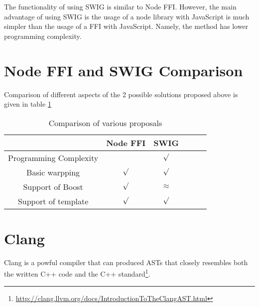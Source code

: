 The functionality of using SWIG is similar to Node FFI. However, the main advantage of using SWIG is the usage of a node library with JavaScript is much simpler than the usage of a FFI with JavaScript. Namely, the method has lower programming complexity. 


\section{Node FFI and SWIG Comparison}
Comparison of different aspects of the 2 possible solutions proposed above is given in table  \ref{tab:ProposalsComparison}

\begin{table}[H] %
    \begin{center}
        \begin{tabular}{c|ccccc}
                                     & Node FFI & SWIG  \\
            \hline
            Programming Complexity   &          &$\surd$ \\  
            
            Basic warpping           &  $\surd$  &$\surd$ \\ 
            
            Support of Boost         & $\surd$  &$\approx$\\
            
            Support of template      &  $\surd$  &$\surd$ \\
                        
            
        \end{tabular}
    \end{center}
    \caption{Comparison of various proposals}
    \label{tab:ProposalsComparison}
\end{table}

\begin{comment}
If too many ideas have been enumerated and none can be totally and formally demonstrated to be the best, then some choice has probably to bemade in order to limit the time-consuming experiments that follow.  It is preferable to achieve a few well-conducted experiments that will provide unquestionable conclusions though in a limited scope.
\end{comment}


\section{Clang}
Clang is a powful compiler that can produced ASTs that closely resembles both the written C++ code and the C++ standard\footnote{\url{http://clang.llvm.org/docs/IntroductionToTheClangAST.html}}.

